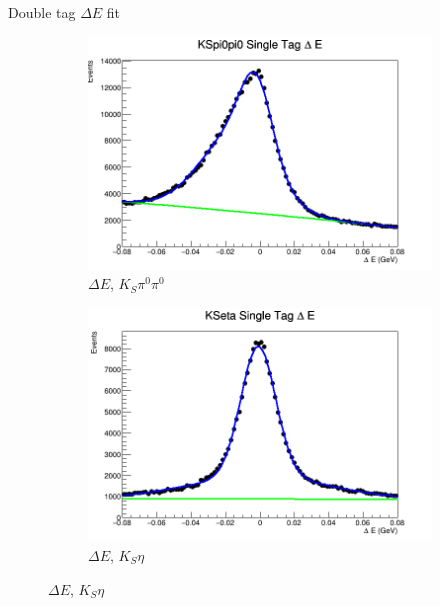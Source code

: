 \documentclass{beamer}
\begin{document}
\begin{frame}{Double tag $\Delta E$ fit}
\begin{figure}
\begin{subfigure}{0.4\textwidth}
      \includegraphics[width=\textwidth]{KSpi0pi0DeltaE.png}
      \caption{$\Delta E$, $K_S\pi^0\pi^0$}
    \end{subfigure}%
    \begin{subfigure}{0.4\textwidth}
      \centering
      \includegraphics[width=\textwidth]{KSetaDeltaE.png}
      \caption{$\Delta E$, $K_S\eta$}
    \end{subfigure}
  \end{figure}
\end{frame}
\end{document}
